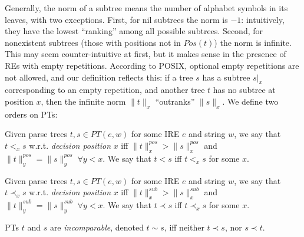 \documentclass[AMA,STIX1COL]{WileyNJD-v2}
\newcommand{\pnorm}[2]{\|{#1}\|^{pos}_{#2}}
\newcommand{\snorm}[2]{\|{#1}\|^{sub}_{#2}}
\begin{document}
Generally, the norm of a subtree means the number of alphabet symbols in its leaves, with two exceptions.
First, for nil subtrees the norm is $-1$: intuitively, they have the lowest ``ranking'' among all possible subtrees.
Second, for nonexistent subtrees (those with positions not in $Pos(t)$) the norm is infinite.
This may seem counter-intuitive at first, but it makes sense in the presence of REs with empty repetitions.
According to POSIX, optional empty repetitions are not allowed, and our definition reflects this:
if a tree $s$ has a subtree $s|_x$ corresponding to an empty repetition,
and another tree $t$ has no subtree at position $x$,
then the infinite norm $\|t\|_x$ ``outranks'' $\|s\|_x$.
We define two orders on PTs:

    \begin{definition}
    \label{total_order_on_PTs}
    Given parse trees $t, s \in PT(e, w)$ for some IRE $e$ and string $w$, we say that $t <_x s$ w.r.t. \emph{decision position} $x$
    iff $\pnorm{t}{x} > \pnorm{s}{x}$ and $\pnorm{t}{y} = \pnorm{s}{y} \; \forall y < x$.
    We say that $t < s$ iff $t <_x s$ for some $x$.
    \end{definition}

    \begin{definition}
    \label{partial_order_on_PTs}
    Given parse trees $t, s \in PT(e, w)$ for some IRE $e$ and string $w$, we say that $t \prec_x s$ w.r.t. \emph{decision position} $x$ %
    iff $\snorm{t}{x} > \snorm{s}{x}$ and $\snorm{t}{y} = \snorm{s}{y} \; \forall y < x$.
    We say that $t \prec s$ iff $t \prec_x s$ for some $x$.
    \end{definition}

    \begin{definition}\label{incomparable_PTs}
    PTs $t$ and $s$ are \emph{incomparable}, denoted $t \sim s$,
    iff neither $t \prec s$, nor $s \prec t$.
    \end{definition}
\end{document}
